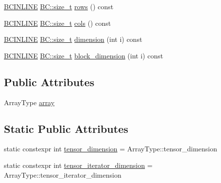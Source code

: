 \begin{DoxyCompactItemize}
\item 
\hyperlink{BlackCat__Common_8h_a6699e8b0449da5c0fafb878e59c1d4b1}{B\+C\+I\+N\+L\+I\+NE} \hyperlink{namespaceBC_a6007cbc4eeec401a037b558910a56173}{B\+C\+::size\+\_\+t} \hyperlink{structBC_1_1tensors_1_1exprs_1_1Unary__Expression_a3f89c0e9538cbd7cdabdb0cd5d2c2fd0}{rows} () const 
\item 
\hyperlink{BlackCat__Common_8h_a6699e8b0449da5c0fafb878e59c1d4b1}{B\+C\+I\+N\+L\+I\+NE} \hyperlink{namespaceBC_a6007cbc4eeec401a037b558910a56173}{B\+C\+::size\+\_\+t} \hyperlink{structBC_1_1tensors_1_1exprs_1_1Unary__Expression_ab9eeb0c49e17f3764454f116d2a254a1}{cols} () const 
\item 
\hyperlink{BlackCat__Common_8h_a6699e8b0449da5c0fafb878e59c1d4b1}{B\+C\+I\+N\+L\+I\+NE} \hyperlink{namespaceBC_a6007cbc4eeec401a037b558910a56173}{B\+C\+::size\+\_\+t} \hyperlink{structBC_1_1tensors_1_1exprs_1_1Unary__Expression_a672c5909eb0edaf6a1b689b9f3c62b66}{dimension} (int i) const 
\item 
\hyperlink{BlackCat__Common_8h_a6699e8b0449da5c0fafb878e59c1d4b1}{B\+C\+I\+N\+L\+I\+NE} \hyperlink{namespaceBC_a6007cbc4eeec401a037b558910a56173}{B\+C\+::size\+\_\+t} \hyperlink{structBC_1_1tensors_1_1exprs_1_1Unary__Expression_a583cb6cfaccc5216ec10dfa2824da481}{block\+\_\+dimension} (int i) const 
\end{DoxyCompactItemize}
\subsection*{Public Attributes}
\begin{DoxyCompactItemize}
\item 
Array\+Type \hyperlink{structBC_1_1tensors_1_1exprs_1_1Unary__Expression_a244683d3774d5c81a77b2e85be9d4f0c}{array}
\end{DoxyCompactItemize}
\subsection*{Static Public Attributes}
\begin{DoxyCompactItemize}
\item 
static constexpr int \hyperlink{structBC_1_1tensors_1_1exprs_1_1Unary__Expression_a1ee189194c7c294c273ad45156b45c36}{tensor\+\_\+dimension} = Array\+Type\+::tensor\+\_\+dimension
\item 
static constexpr int \hyperlink{structBC_1_1tensors_1_1exprs_1_1Unary__Expression_a26db9f70d37b660cf350436ca0d76d1a}{tensor\+\_\+iterator\+\_\+dimension} = Array\+Type\+::tensor\+\_\+iterator\+\_\+dimension
\end{DoxyCompactItemize}


